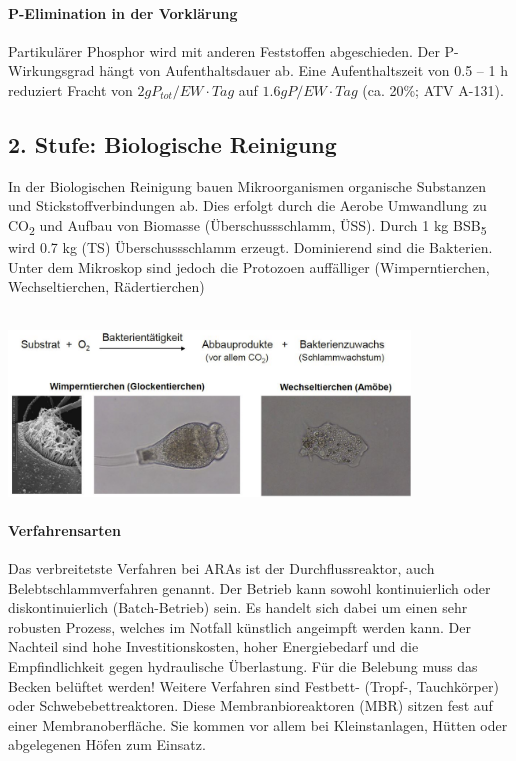\documentclass[9pt, openright=false]{scrartcl}
\begin{document}
\paragraph{P-Elimination in der Vorklärung}Partikulärer Phosphor wird mit anderen Feststoffen abgeschieden. Der P-Wirkungsgrad hängt von Aufenthaltsdauer ab. Eine Aufenthaltszeit von 0.5 – 1 h reduziert Fracht von $2g P_{tot}/EW \cdot Tag$ auf $1.6g P/EW \cdot Tag$ (ca. 20\%; ATV A-131).
\subsection{2. Stufe: Biologische Reinigung}
In der Biologischen Reinigung bauen Mikroorganismen organische Substanzen und Stickstoffverbindungen ab. Dies erfolgt durch die Aerobe Umwandlung zu CO\textsubscript{2} und Aufbau von Biomasse (Überschussschlamm, ÜSS). Durch 1 kg BSB\textsubscript{5} wird 0.7 kg (TS) Überschussschlamm erzeugt. Dominierend sind die Bakterien. Unter dem Mikroskop sind jedoch die Protozoen auffälliger (Wimperntierchen, Wechseltierchen, Rädertierchen) \\ \\
\begin{center}
\includegraphics[width=0.8\textwidth]{images/tierchen}
\end{center}
\paragraph{Verfahrensarten} Das verbreitetste Verfahren bei ARAs ist der Durchflussreaktor, auch Belebtschlammverfahren genannt. Der Betrieb kann sowohl kontinuierlich oder diskontinuierlich (Batch-Betrieb) sein. Es handelt sich dabei um einen sehr robusten Prozess, welches im Notfall künstlich angeimpft werden kann. Der Nachteil sind hohe Investitionskosten, hoher Energiebedarf und die Empfindlichkeit gegen hydraulische Überlastung. Für die Belebung muss das Becken belüftet werden! Weitere Verfahren sind Festbett- (Tropf-, Tauchkörper)  oder Schwebebettreaktoren. Diese Membranbioreaktoren (MBR) sitzen fest auf einer Membranoberfläche. Sie kommen vor allem bei Kleinstanlagen, Hütten oder abgelegenen Höfen zum Einsatz. 
\end{document}
